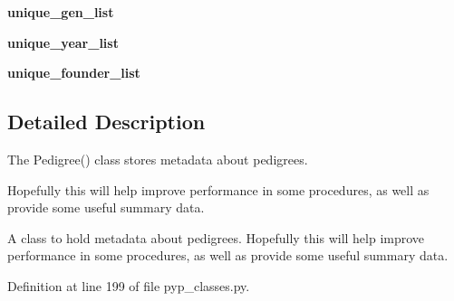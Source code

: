 \begin{DoxyCompactItemize}
\item 
\hypertarget{classPyPedal_1_1pyp__classes_1_1Pedigree_ad7407edfa4137d35c03a219e7bb6e12f}{
{\bfseries unique\_\-gen\_\-list}}
\label{classPyPedal_1_1pyp__classes_1_1Pedigree_ad7407edfa4137d35c03a219e7bb6e12f}

\item 
\hypertarget{classPyPedal_1_1pyp__classes_1_1Pedigree_a879e092db5cd36a44d60ba96e536346a}{
{\bfseries unique\_\-year\_\-list}}
\label{classPyPedal_1_1pyp__classes_1_1Pedigree_a879e092db5cd36a44d60ba96e536346a}

\item 
\hypertarget{classPyPedal_1_1pyp__classes_1_1Pedigree_a691b90a99107c293d97b6d8611781beb}{
{\bfseries unique\_\-founder\_\-list}}
\label{classPyPedal_1_1pyp__classes_1_1Pedigree_a691b90a99107c293d97b6d8611781beb}

\end{DoxyCompactItemize}


\subsection{Detailed Description}
The Pedigree() class stores metadata about pedigrees. 

Hopefully this will help improve performance in some procedures, as well as provide some useful summary data. \begin{DoxyVerb}A class to hold metadata about pedigrees.  Hopefully this will help improve performance in some procedures, as well as
provide some useful summary data.\end{DoxyVerb}
 

Definition at line 199 of file pyp\_\-classes.py.



